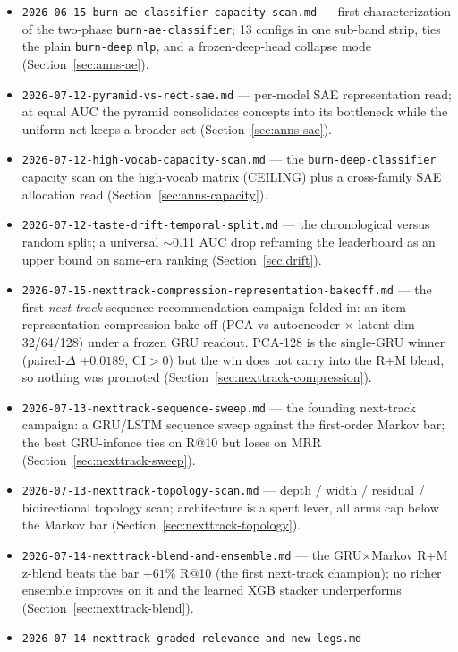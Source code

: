\documentclass[11pt]{article}
\begin{document}
\begin{itemize}
  \item \texttt{2026-06-15-burn-ae-classifier-capacity-scan.md} --- first
    characterization of the two-phase \texttt{burn-ae-classifier}; 13 configs in
    one sub-band strip, ties the plain \texttt{burn-deep} \texttt{mlp}, and a
    frozen-deep-head collapse mode (Section~\ref{sec:anns-ae}).
  \item \texttt{2026-07-12-pyramid-vs-rect-sae.md} --- per-model SAE
    representation read; at equal AUC the pyramid consolidates concepts into its
    bottleneck while the uniform net keeps a broader set
    (Section~\ref{sec:anns-sae}).
  \item \texttt{2026-07-12-high-vocab-capacity-scan.md} --- the
    \texttt{burn-deep-classifier} capacity scan on the high-vocab matrix
    (CEILING) plus a cross-family SAE allocation read
    (Section~\ref{sec:anns-capacity}).
  \item \texttt{2026-07-12-taste-drift-temporal-split.md} --- the chronological
    versus random split; a universal $\sim$0.11 AUC drop reframing the
    leaderboard as an upper bound on same-era ranking (Section~\ref{sec:drift}).
  \item \texttt{2026-07-15-nexttrack-compression-representation-bakeoff.md} ---
    the first \emph{next-track} sequence-recommendation campaign folded in: an
    item-representation compression bake-off (PCA vs autoencoder $\times$ latent
    dim 32/64/128) under a frozen GRU readout. PCA-128 is the single-GRU winner
    (paired-$\Delta$ $+0.0189$, CI$>$0) but the win does not carry into the R+M
    blend, so nothing was promoted (Section~\ref{sec:nexttrack-compression}).
  \item \texttt{2026-07-13-nexttrack-sequence-sweep.md} --- the founding
    next-track campaign: a GRU/LSTM sequence sweep against the first-order
    Markov bar; the best GRU-infonce ties on R@10 but loses on MRR
    (Section~\ref{sec:nexttrack-sweep}).
  \item \texttt{2026-07-13-nexttrack-topology-scan.md} --- depth / width /
    residual / bidirectional topology scan; architecture is a spent lever, all
    arms cap below the Markov bar (Section~\ref{sec:nexttrack-topology}).
  \item \texttt{2026-07-14-nexttrack-blend-and-ensemble.md} --- the
    GRU$\times$Markov R+M z-blend beats the bar $+61\%$ R@10 (the first
    next-track champion); no richer ensemble improves on it and the learned XGB
    stacker underperforms (Section~\ref{sec:nexttrack-blend}).
  \item \texttt{2026-07-14-nexttrack-graded-relevance-and-new-legs.md} ---

\end{itemize}
\end{document}
